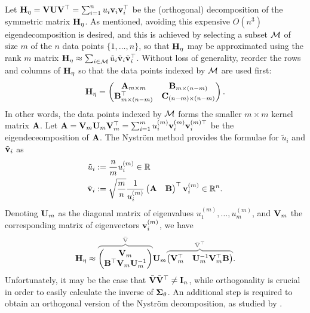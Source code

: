 Let ${\mathbf H}_\eta = {\mathbf V}{\mathbf U}{\mathbf V}^\top = \sum_{i=1}^n u_i {\mathbf v}_i {\mathbf v}_i^\top$ be the (orthogonal) decomposition of the symmetric matrix ${\mathbf H}_\eta$.
As mentioned, avoiding this expensive $O(n^3)$ eigendecomposition is desired, and this is achieved by selecting a subset ${\mathcal M}$ of size $m$ of the $n$ data points $\{1,\dots,n \}$, so that ${\mathbf H}_\eta$ may be approximated using the rank $m$ matrix ${\mathbf H}_\eta \approx \sum_{i\in{\mathcal M}} \tilde u_i \tilde{{\mathbf v}}_i\tilde{{\mathbf v}}_i^\top$.
Without loss of generality, reorder the rows and columns of ${\mathbf H}_\eta$ so that the data points indexed by ${\mathcal M}$ are used first:
%
\[
  {\mathbf H}_\eta =
  \begin{pmatrix}
    {\mathbf A}_{m\times m}         & {\mathbf B}_{m \times (n-m)} \\
    {\mathbf B}_{m \times (n-m)}^\top  & {\mathbf C}_{(n-m) \times (n-m)} \\
  \end{pmatrix}.
\]
%
In other words, the data points indexed by ${\mathcal M}$ forms the smaller $m\times m$ kernel matrix ${\mathbf A}$. 
Let ${\mathbf A} = {\mathbf V}_m{\mathbf U}_m{\mathbf V}_m^\top = \sum_{i=1}^m u_i^{(m)}{\mathbf v}_i^{(m)}{\mathbf v}_i^{(m)\top}$ be the eigendeceomposition of ${\mathbf A}$.
The Nyström method provides the formulae for $\tilde u_i$ and $\tilde{{\mathbf v}}_i$ \citep[§8.1, equations 8.2 and 8.3]{rasmussen2006gaussian} as
\begin{align*}
  \tilde u_i &:= \frac{n}{m} u_i^{(m)} \in \mathbb{R} \\
  \tilde {{\mathbf v}}_i &:= \sqrt{\frac{m}{n}} \frac{1}{u_i^{(m)}}
  \begin{pmatrix}
    {\mathbf A} & {\mathbf B}
  \end{pmatrix}^\top
  {\mathbf v}_i^{(m)} \in \mathbb{R}^n.
\end{align*}
Denoting ${\mathbf U}_m$ as the diagonal matrix of eigenvalues $u_1^{(m)},\dots,u_m^{(m)}$, and ${\mathbf V}_m$ the corresponding matrix of eigenvectors ${\mathbf v}_i^{(m)}$, we have
\[
  \bH_\eta \approx
  {\color{gray}
  \overbrace{\color{black}
  \begin{pmatrix}
    \bV_m \\
    \bB^\top\bV_m\bU_m^{-1}
  \end{pmatrix}
  }^{\bar\bV}
  }
  \bU_m
  {\color{gray}
  \overbrace{\color{black}
  \begin{pmatrix}
    \bV_m^\top & \bU_m^{-1}\bV_m^\top\bB
  \end{pmatrix}
  }^{\bar\bV^\top}
  }.
\]
Unfortunately, it may be the case that $\bar{{\mathbf V}}\bar{{\mathbf V}}^\top \neq {\mathbf I}_n$, while orthogonality is crucial in order to easily calculate the inverse of ${\bm\Sigma}_\theta$.
An additional step is required to obtain an orthogonal version of the Nyström decomposition, as studied by \citet{fowlkes2001efficient}.
